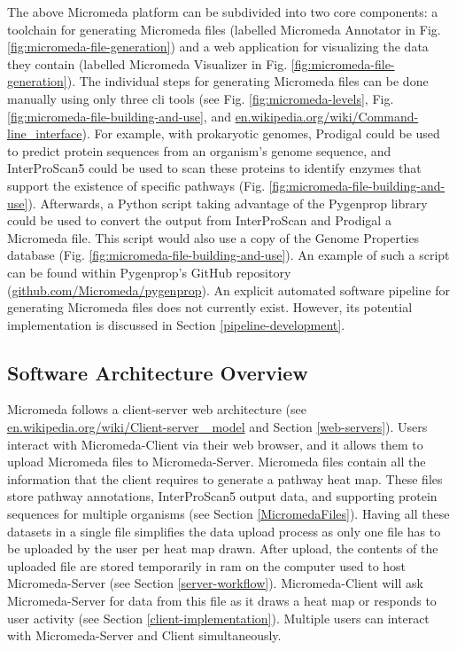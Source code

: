 The above Micromeda platform can be subdivided into two core components: a toolchain for generating Micromeda files (labelled Micromeda Annotator in Fig. \ref{fig:micromeda-file-generation}) and a web application for visualizing the data they contain (labelled Micromeda Visualizer in Fig. \ref{fig:micromeda-file-generation}). The individual steps for generating Micromeda files can be done manually using only three \gls{cli} tools (see Fig. \ref{fig:micromeda-levels}, Fig. \ref{fig:micromeda-file-building-and-use}, and  \href{http://en.wikipedia.org/wiki/Command-line_interface}{en.wikipedia.org/wiki/Command-line\_interface}). For example, with prokaryotic genomes, Prodigal could be used to predict protein sequences from an organism's genome sequence, and InterProScan5 could be used to scan these proteins to identify enzymes that support the existence of specific pathways (Fig. \ref{fig:micromeda-file-building-and-use}). Afterwards, a Python script taking advantage of the Pygenprop library could be used to convert the output from InterProScan and Prodigal a Micromeda file. This script would also use a copy of the Genome Properties database (Fig. \ref{fig:micromeda-file-building-and-use}). An example of such a script can be found within Pygenprop's GitHub repository (\href{http://github.com/Micromeda/pygenprop}{github.com/Micromeda/pygenprop}). An explicit automated software pipeline for generating Micromeda files does not currently exist. However, its potential implementation is discussed in Section \ref{pipeline-development}.

\subsection{Software Architecture Overview}

Micromeda follows a client-server web architecture \cite{svobodova1985client} (see \href{http://en.wikipedia.org/wiki/Client-server_model}{en.wikipedia.org/wiki/Client-server \_model} and Section \ref{web-servers}). Users interact with Micromeda-Client via their web browser, and it allows them to upload Micromeda files to Micromeda-Server. Micromeda files contain all the information that the client requires to generate a pathway heat map. These files store pathway annotations, InterProScan5 output data, and supporting protein sequences for multiple organisms (see Section \ref{MicromedaFiles}). Having all these datasets in a single file simplifies the data upload process as only one file has to be uploaded by the user per heat map drawn. After upload, the contents of the uploaded file are stored temporarily in \gls{ram} on the computer used to host Micromeda-Server (see Section \ref{server-workflow}). Micromeda-Client will ask Micromeda-Server for data from this file as it draws a heat map or responds to user activity (see Section \ref{client-implementation}). Multiple users can interact with Micromeda-Server and Client simultaneously.

